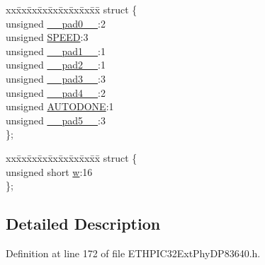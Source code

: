 \begin{DoxyCompactItemize}
\begin{tabbing}
\end{tabbing}\item 
\begin{tabbing}
xx\=xx\=xx\=xx\=xx\=xx\=xx\=xx\=xx\=\kill
struct \{\\
\>unsigned \hyperlink{union_____p_h_y_c_t_r_lbits__t_adf71f3d8410c1f1dbbc96680a92c49af}{\_\_pad0\_\_}:2\\
\>unsigned \hyperlink{union_____p_h_y_c_t_r_lbits__t_a95fd4dafd860304d6b44d4fb14881daa}{SPEED}:3\\
\>unsigned \hyperlink{union_____p_h_y_c_t_r_lbits__t_acaf2d0924a107ec6e8d2e31febaf66f9}{\_\_pad1\_\_}:1\\
\>unsigned \hyperlink{union_____p_h_y_c_t_r_lbits__t_a4d97cc5f7d51d22fc2bf3eab35c9cb7f}{\_\_pad2\_\_}:1\\
\>unsigned \hyperlink{union_____p_h_y_c_t_r_lbits__t_ad7d7cee33e0c7f447abc4d171c628dd4}{\_\_pad3\_\_}:3\\
\>unsigned \hyperlink{union_____p_h_y_c_t_r_lbits__t_a8d1e932de3f1bdec682271c90f2ca15c}{\_\_pad4\_\_}:2\\
\>unsigned \hyperlink{union_____p_h_y_c_t_r_lbits__t_ad238dd3a8b84eda366fc8a19c6037eb5}{AUTODONE}:1\\
\>unsigned \hyperlink{union_____p_h_y_c_t_r_lbits__t_a6df3bf63e0997c63a76308dd8e93971e}{\_\_pad5\_\_}:3\\
\}; \\

\end{tabbing}\item 
\begin{tabbing}
xx\=xx\=xx\=xx\=xx\=xx\=xx\=xx\=xx\=\kill
struct \{\\
\>unsigned short \hyperlink{union_____p_h_y_c_t_r_lbits__t_a160850a4684a3e82c2323033964f2e98}{w}:16\\
\}; \\

\end{tabbing}\end{DoxyCompactItemize}


\subsection{Detailed Description}


Definition at line 172 of file E\+T\+H\+P\+I\+C32\+Ext\+Phy\+D\+P83640.\+h.



